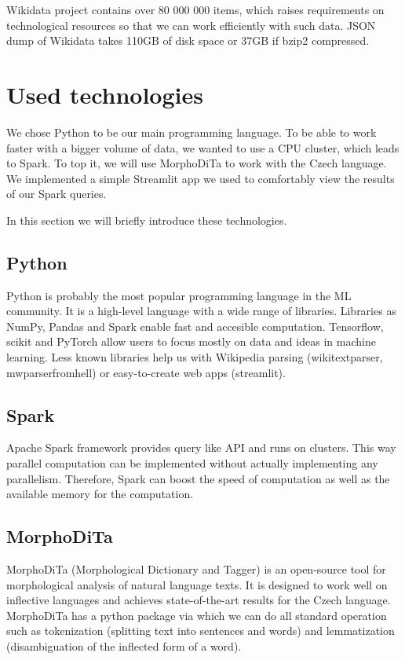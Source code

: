 Wikidata project contains over 80 000 000 items, which raises  requirements on technological resources so that we can work efficiently with such data. JSON dump of Wikidata takes 110GB of disk space or 37GB if bzip2 compressed.



\section{Used technologies}
We chose Python to be our main programming language. To be able to work faster with a bigger volume of data, we wanted to use a CPU cluster, which leads to Spark. To top it, we will use MorphoDiTa to work with the Czech language. We implemented a simple Streamlit app we used to comfortably view the results of our Spark queries.

In this section we will briefly introduce these technologies.

\subsection{Python}
Python is probably the most popular programming language in the ML community. It is a high-level language with a wide range of libraries. Libraries as NumPy, Pandas and Spark enable fast and accesible computation. Tensorflow, scikit and PyTorch allow users to focus mostly on data and ideas in machine learning. Less known libraries help us with Wikipedia parsing (wikitextparser, mwparserfromhell) or easy-to-create web apps (streamlit).

\subsection{Spark}
Apache Spark framework provides query like API and runs on clusters. This way parallel computation can be implemented without actually implementing any parallelism. Therefore, Spark can boost the speed of computation as well as the available memory for the computation.


\subsection{MorphoDiTa}

MorphoDiTa \cite{Morphodita} (Morphological Dictionary and Tagger) is an open-source tool for morphological analysis of natural language texts. It is designed to work well on inflective languages and achieves state-of-the-art results for the Czech language. MorphoDiTa has a python package via which we can do all standard operation such as tokenization (splitting text into sentences and words) and lemmatization (disambiguation of the inflected form of a word).

